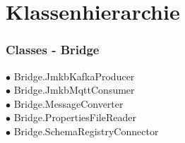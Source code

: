 \chapter{Klassenhierarchie}
\subsection*{Classes - Bridge}
{\raggedright
	\hspace{0.0cm} $\bullet$ Bridge.JmkbKafkaProducer {\tiny {}} \\
	\hspace{0.0cm} $\bullet$ Bridge.JmkbMqttConsumer {\tiny {}} \\
	\hspace{0.0cm} $\bullet$ Bridge.MessageConverter {\tiny {}} \\
	\hspace{0.0cm} $\bullet$ Bridge.PropertiesFileReader {\tiny {}} \\
	\hspace{0.0cm} $\bullet$ Bridge.SchemaRegistryConnector {\tiny {}} \\
}
